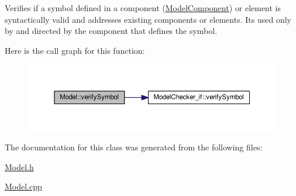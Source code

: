 Verifies if a symbol defined in a component (\hyperlink{class_model_component}{Model\+Component}) or element is syntactically valid and addresses existing components or elements. It\textquotesingle{}s used only by and directed by the component that defines the symbol. 



Here is the call graph for this function\+:\nopagebreak
\begin{figure}[H]
\begin{center}
\leavevmode
\includegraphics[width=350pt]{class_model_ae2be8579f8519eec5da9e6f72c7ec361_cgraph}
\end{center}
\end{figure}




The documentation for this class was generated from the following files\+:\begin{DoxyCompactItemize}
\item 
\hyperlink{_model_8h}{Model.\+h}\item 
\hyperlink{_model_8cpp}{Model.\+cpp}\end{DoxyCompactItemize}
